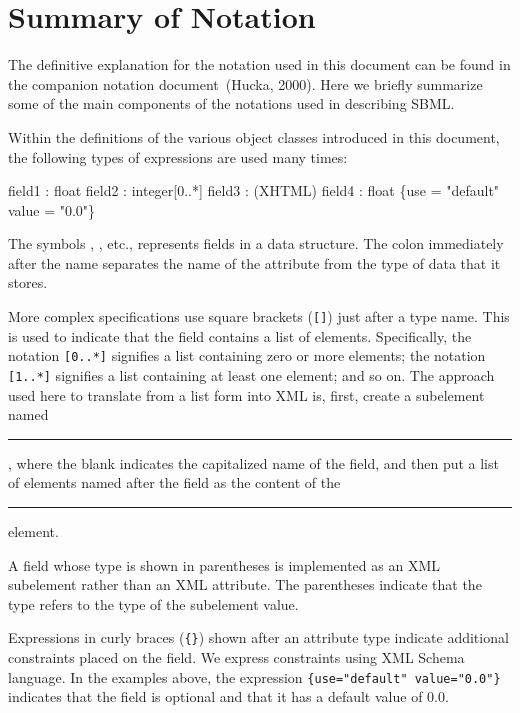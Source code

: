 \documentclass[10pt,twocolumntoc]{cekarticle}
\begin{document}
\section{Summary of Notation}
\label{apdx:notation}

The definitive explanation for the notation used in this document can be
found in the companion notation document~(Hucka, 2000).  Here we briefly
summarize some of the main components of the notations used in describing
SBML.

Within the definitions of the various object classes introduced in this
document, the following types of expressions are used many times:

\begin{example}
  field1 : float
  field2 : integer[0..*]
  field3 : (XHTML)
  field4 : float \{use = "default" value = "0.0"\}
\end{example}

The symbols , , etc., represents fields in a
data structure.  The colon immediately after the name separates the name of
the attribute from the type of data that it stores.

More complex specifications use square brackets (\texttt{[]}) just after a
type name.  This is used to indicate that the field contains a list of
elements.  Specifically, the notation \texttt{[0..*]} signifies a list
containing zero or more elements; the notation \texttt{[1..*]} signifies a
list containing at least one element; and so on.  The approach used here to
translate from a list form into XML is, first, create a subelement named
\rule{0.5in}{0.5pt}, where the blank indicates the
capitalized name of the field, and then put a list of elements named after
the field as the content of the \rule{0.5in}{0.5pt}
element.

A field whose type is shown in parentheses is implemented as an
XML subelement rather than an XML attribute.  The parentheses
indicate that the type refers to the type of the subelement value.

Expressions in curly braces (\texttt{\{\}}) shown after an
attribute type indicate additional constraints placed on the
field.  We express constraints using XML Schema language.  In the
examples above, the expression \texttt{\{use="default"
value="0.0"\}} indicates that the field  is
optional and that it has a default value of $0.0$.
\end{document}
